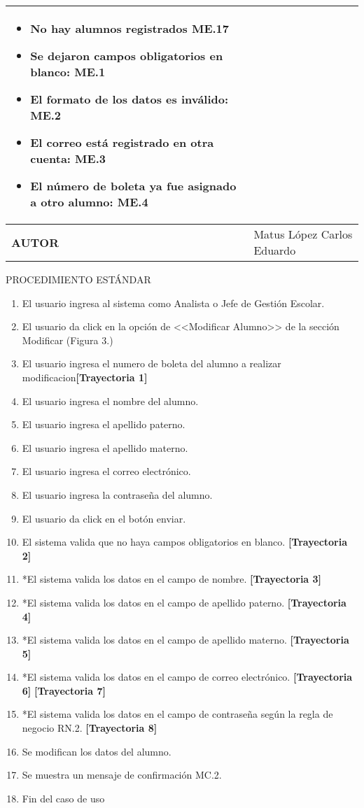 \begin{longtable}{ | p{6cm} | p{10cm} |}
\begin{itemize}
\item No hay alumnos registrados ME.17
    \item Se dejaron campos obligatorios en blanco: ME.1
    \item El formato de los datos es inválido: ME.2
    \item El correo está registrado en otra cuenta: ME.3
    \item El número de boleta ya fue asignado a otro alumno: ME.4
\end{itemize}\\
\hline
\textbf{AUTOR} & Matus López Carlos Eduardo\\
\hline
\end{longtable}
\vspace*{1cm}
\noindent
\Large{PROCEDIMIENTO ESTÁNDAR}
\large{}
\begin{enumerate}
    \item El usuario ingresa al sistema como Analista o Jefe de Gestión Escolar.
    \item El usuario da click en la opción de <<Modificar Alumno>> de la sección Modificar (Figura 3.)
    \item El usuario ingresa el numero de boleta del alumno a realizar modificacion\textbf{[Trayectoria 1]}
    \item El usuario ingresa el nombre del alumno.
    \item El usuario ingresa el apellido paterno.
    \item El usuario ingresa el apellido materno.
    \item El usuario ingresa el correo electrónico.
    \item El usuario ingresa la contraseña del alumno.
    \item El usuario da click en el botón enviar.
    \item El sistema valida que no haya campos obligatorios en blanco. \textbf{[Trayectoria 2]}
    \item *El sistema valida los datos en el campo de nombre. \textbf{[Trayectoria 3]}
    \item *El sistema valida los datos en el campo de apellido paterno. \textbf{[Trayectoria 4]}
    \item *El sistema valida los datos en el campo de apellido materno. \textbf{[Trayectoria 5]}
    \item *El sistema valida los datos en el campo de correo electrónico. \textbf{[Trayectoria 6]} \textbf{[Trayectoria 7]}
    \item *El sistema valida los datos en el campo de contraseña según la regla de negocio RN.2. \textbf{[Trayectoria 8]}
    \item Se modifican los datos del alumno.
    \item Se muestra un mensaje de confirmación MC.2.
    \item Fin del caso de uso
\end{enumerate}
